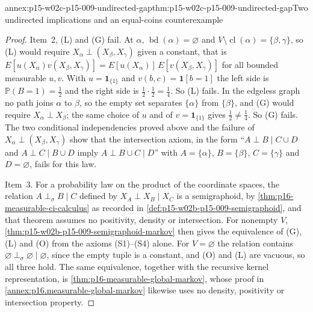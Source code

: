 \begin{annexitem}{annex:p15-w02c-p15-009-undirected-gap}{thm:p15-w02c-p15-009-undirected-gap}{Two undirected implications and an equal-coins counterexample}
\begin{proof}
Item~2, (L) and (G) fail. At \(\alpha\),
\(\operatorname{bd}(\alpha)=\varnothing\) and
\(V\setminus\operatorname{cl}(\alpha)=\{\beta,\gamma\}\), so (L) would
require \(X_\alpha\perp(X_\beta,X_\gamma)\) given a constant, that is
\(E[u(X_\alpha)v(X_\beta,X_\gamma)]=E[u(X_\alpha)]\,E[v(X_\beta,X_\gamma)]\)
for all bounded measurable \(u,v\). With \(u=\mathbf 1_{\{1\}}\) and
\(v(b,c)=\mathbf 1[b=1]\) the left side is \(\mathbb P(B=1)=\tfrac12\)
and the right side is \(\tfrac12\cdot\tfrac12=\tfrac14\). So (L) fails.
In the edgeless graph no path joins \(\alpha\) to \(\beta\), so the empty
set separates \(\{\alpha\}\) from \(\{\beta\}\), and (G) would require
\(X_\alpha\perp X_\beta\); the same choice of \(u\) and of
\(v=\mathbf 1_{\{1\}}\) gives \(\tfrac12\ne\tfrac14\). So (G) fails.
The two conditional independencies proved above and the failure of
\(X_\alpha\perp(X_\beta,X_\gamma)\) show that the intersection axiom, in
the form ``\(A\perp B\mid C\cup D\) and \(A\perp C\mid B\cup D\) imply
\(A\perp B\cup C\mid D\)'' with \(A=\{\alpha\}\), \(B=\{\beta\}\),
\(C=\{\gamma\}\) and \(D=\varnothing\), fails for this law.

Item~3. For a probability law on the product of the coordinate spaces,
the relation \(A\perp_\sigma B\mid C\) defined by
\(X_A\perp X_B\mid X_C\) is a semigraphoid, by
\cref{thm:p16-measurable-ci-calculus} as recorded in
\cref{def:p15-w02b-p15-009-semigraphoid}, and that theorem assumes no
positivity, density or intersection. For nonempty \(V\),
\cref{thm:p15-w02b-p15-009-semigraphoid-markov} then gives the
equivalence of (G), (L) and (O) from the axioms (S1)--(S4) alone. For
\(V=\varnothing\) the relation contains
\(\varnothing\perp_\sigma\varnothing\mid\varnothing\), since the empty
tuple is a constant, and (O) and (L) are vacuous, so all three hold. The
same equivalence, together with the recursive kernel representation, is
\cref{thm:p16-measurable-global-markov}, whose proof in
\cref{annex:p16.measurable-global-markov} likewise uses no density,
positivity or intersection property.
\end{proof}
\end{annexitem}

